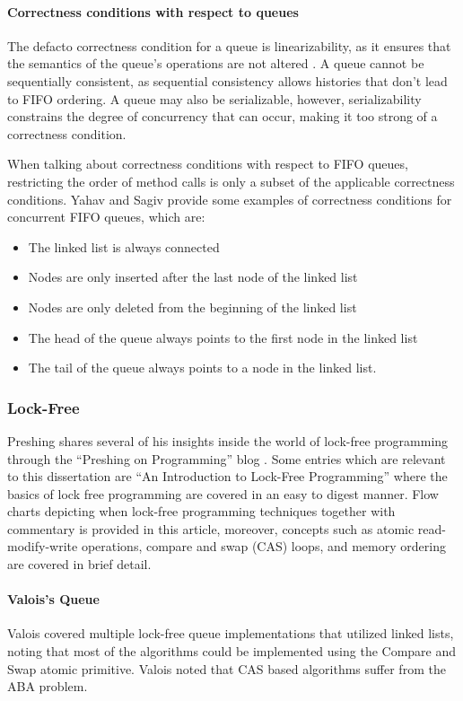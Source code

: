 \documentclass[a4paper, 12pt, titlepage]{article}
\begin{document}
\begin{onehalfspacing}
\paragraph{Correctness conditions with respect to queues}
The defacto correctness condition for a queue is linearizability, as it ensures that the semantics of the queue's operations are not altered \cite{mellor1987concurrent}. A queue cannot be sequentially consistent, as sequential consistency allows histories that don't lead to FIFO ordering. A queue may also be serializable, however, serializability constrains the degree of concurrency that can occur, making it too strong of a correctness condition.

When talking about correctness conditions with respect to FIFO queues, restricting the order of method calls is only a subset of the applicable correctness conditions. Yahav and Sagiv\cite{yahav2003automatically} provide some examples of correctness conditions for concurrent FIFO queues, which are:
\begin{itemize}
  \item The linked list is always connected
  \item Nodes are only inserted after the last node of the linked list
  \item Nodes are only deleted from the beginning of the linked list
  \item The head of the queue always points to the first node in the linked list
  \item The tail of the queue always points to a node in the linked list.
\end{itemize}

\subsubsection{Lock-Free}
\label{lock-free-queues}
Preshing shares several of his insights inside the world of lock-free programming through the ``Preshing on Programming'' blog \cite{preshing}. Some entries which are relevant to this dissertation are ``An Introduction to Lock-Free Programming''\cite{introlockfree} where the basics of lock free programming are covered in an easy to digest manner. Flow charts depicting when lock-free programming techniques together with commentary is provided in this article, moreover, concepts such as atomic read-modify-write operations, compare and swap (CAS) loops, and memory ordering are covered in brief detail. 

\paragraph{Valois's Queue}
Valois covered multiple lock-free queue implementations that utilized linked lists, noting that most of the algorithms could be implemented using the Compare and Swap atomic primitive. Valois noted that CAS based algorithms suffer from the ABA problem. \cite{valois1994implementing}


\end{onehalfspacing}
\end{document}
